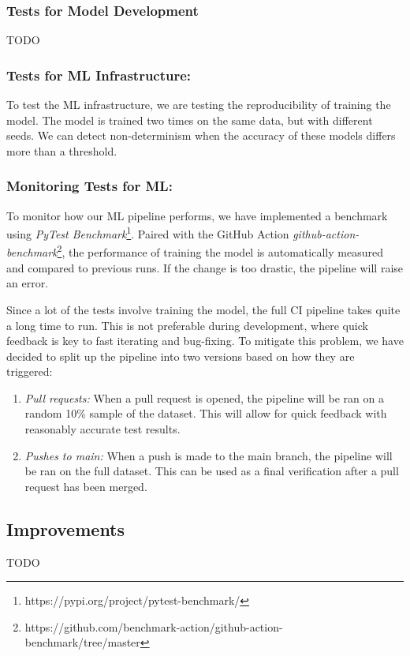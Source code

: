 \subsubsection{Tests for Model Development}
TODO

\subsubsection{Tests for ML Infrastructure:} To test the ML infrastructure, we are testing the reproducibility of training the model. The model is trained two times on the same data, but with different seeds. We can detect non-determinism when the accuracy of these models differs more than a threshold.

\subsubsection{Monitoring Tests for ML:} To monitor how our ML pipeline performs, we have implemented a benchmark using \textit{PyTest Benchmark}\footnote{https://pypi.org/project/pytest-benchmark/}. Paired with the GitHub Action \textit{github-action-benchmark}\footnote{https://github.com/benchmark-action/github-action-benchmark/tree/master}, the performance of training the model is automatically measured and compared to previous runs. If the change is too drastic, the pipeline will raise an error.

Since a lot of the tests involve training the model, the full CI pipeline takes quite a long time to run. This is not preferable during development, where quick feedback is key to fast iterating and bug-fixing. To mitigate this problem, we have decided to split up the pipeline into two versions based on how they are triggered:

\begin{enumerate}
    \item \textit{Pull requests:} When a pull request is opened, the pipeline will be ran on a random 10\% sample of the dataset. This will allow for quick feedback with reasonably accurate test results.
    \item \textit{Pushes to main:} When a push is made to the main branch, the pipeline will be ran on the full dataset. This can be used as a final verification after a pull request has been merged.
\end{enumerate}

\subsection{Improvements}
TODO